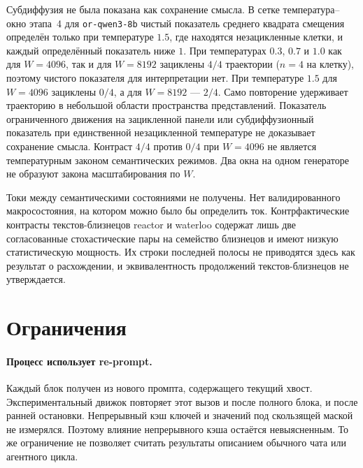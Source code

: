 \documentclass[10pt]{article}
\begin{document}
Субдиффузия не была показана как сохранение смысла.
В сетке температура--окно этапа~4 для \texttt{or-qwen3-8b}
чистый показатель среднего квадрата смещения определён только
при температуре $1.5$, где находятся незацикленные клетки,
и каждый определённый показатель ниже $1$. %
При температурах $0.3$, $0.7$ и $1.0$ как для $W{=}4096$,
так и для $W{=}8192$ зациклены $4/4$ траектории ($n{=}4$ на клетку),
поэтому чистого показателя для интерпретации нет. %
При температуре $1.5$ для $W{=}4096$ зациклены $0/4$,
а для $W{=}8192$ --- $2/4$. %
Само повторение удерживает траекторию в небольшой области пространства
представлений.
Показатель ограниченного движения на зацикленной панели
или субдиффузионный показатель при единственной незацикленной температуре
не доказывает сохранение смысла.
Контраст $4/4$ против $0/4$ при $W{=}4096$
не является температурным законом семантических режимов.
Два окна на одном генераторе не образуют закона масштабирования по $W$.

Токи между семантическими состояниями не получены.
Нет валидированного макросостояния, на котором можно было бы определить ток.
Контрфактические контрасты текстов-близнецов reactor и waterloo содержат
лишь две согласованные стохастические пары на семейство близнецов
и имеют низкую статистическую мощность. %
Их строки последней полосы не приводятся здесь как результат о расхождении,
и эквивалентность продолжений текстов-близнецов не утверждается.

\section{Ограничения}
\label{sec:limitations}

\paragraph{Процесс использует re-prompt.}
Каждый блок получен из нового промпта, содержащего текущий хвост.
Экспериментальный движок повторяет этот вызов и после полного блока,
и после ранней остановки.
Непрерывный кэш ключей и значений под скользящей маской не измерялся.
Поэтому влияние непрерывного кэша остаётся невыясненным.
То же ограничение не позволяет считать результаты описанием
обычного чата или агентного цикла.
\end{document}
